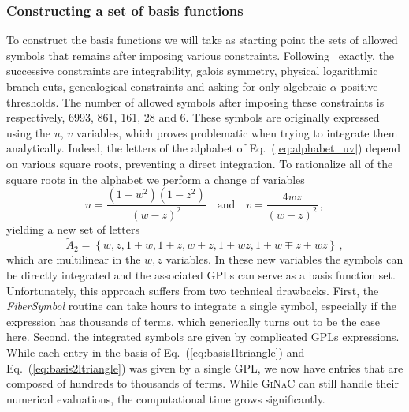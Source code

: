 \documentclass[a4paper,11pt]{article}
\begin{document}
\subsubsection{Constructing a set of basis functions}
To construct the basis functions we will take as starting point the sets of allowed symbols that remains after imposing various constraints. Following~\cite{Hannesdottir:2024hke} exactly, the successive constraints 
are integrability, galois symmetry, physical logarithmic branch cuts, genealogical constraints and asking for only algebraic $\alpha$-positive thresholds. The number of allowed symbols after imposing these constraints is respectively,  6993, 861, 161, 28 and 6. These symbols are originally expressed using the $u$, $v$ variables, which proves problematic when trying to integrate them analytically. Indeed, the letters of the alphabet of Eq.~(\ref{eq:alphabet_uv}) depend on various square roots, preventing a direct integration. To rationalize all of the square roots in the alphabet we perform a change of variables~\cite{Caron-Huot:2014lda}
\begin{equation}
    u = \frac{(1-w^2)(1-z^2)}{(w-z)^2} \quad \text{and}\quad v=\frac{4 w z}{(w-z)^2} \,,
\end{equation}
yielding a new set of letters
\begin{equation}
    \tilde{A}_2 = \left\{w, z, 1\pm w, 1\pm z, w \pm z, 1 \pm w z, 1 \pm w \mp z + wz\right\} \,,
\end{equation}
which are multilinear in the $w, z$ variables. In these new variables the symbols can be directly integrated and the associated GPLs can serve as a basis function set. Unfortunately, this approach suffers from two technical drawbacks. First, the \textit{FiberSymbol} routine can take hours to integrate a single symbol, especially if the expression has thousands of terms, which generically turns out to be the case here. Second, the integrated symbols are given by complicated GPLs expressions. While each entry in the basis of Eq.~(\ref{eq:basis1ltriangle}) and Eq.~(\ref{eq:basis2ltriangle}) was given by a single GPL, we now have entries that are composed of hundreds to thousands of terms. While \textsc{GiNaC} can still handle their numerical evaluations, the computational time grows significantly.
\end{document}
